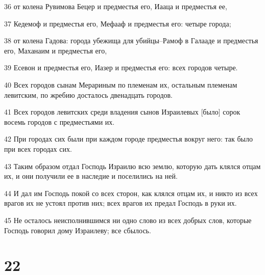 \par 36 от колена Рувимова Бецер и предместья его, Иааца и предместья ее,
\par 37 Кедемоф и предместья его, Мефааф и предместья его: четыре города;
\par 38 от колена Гадова: города убежища для убийцы--Рамоф в Галааде и предместья его, Маханаим и предместья его,
\par 39 Есевон и предместья его, Иазер и предместья его: всех городов четыре.
\par 40 Всех городов сынам Мерариным по племенам их, остальным племенам левитским, по жребию досталось двенадцать городов.
\par 41 Всех городов левитских среди владения сынов Израилевых [было] сорок восемь городов с предместьями их.
\par 42 При городах сих были при каждом городе предместья вокруг него: так было при всех городах сих.
\par 43 Таким образом отдал Господь Израилю всю землю, которую дать клялся отцам их, и они получили ее в наследие и поселились на ней.
\par 44 И дал им Господь покой со всех сторон, как клялся отцам их, и никто из всех врагов их не устоял против них; всех врагов их предал Господь в руки их.
\par 45 Не осталось неисполнившимся ни одно слово из всех добрых слов, которые Господь говорил дому Израилеву; все сбылось.

\chapter{22}

